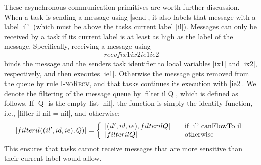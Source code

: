 These asynchronous communication primitives are worth further
discussion.  When a task is sending a message using |send|, it also labels that
message with a label |il'| (which must be above the tasks current label |il|).
Messages can only be received by a task if its current label is
at least as high as the label of the message.
Specifically, receiving a message using
\[ |recvf ix1 ix2 ie1 ie2| \]
binds the message and the senders task identifier
to local variables |ix1| and |ix2|, respectively, and then executes |ie1|.
Otherwise the message gets removed from the queue by rule \textsc{I-noRecv},
and that tasks continues its execution with |ie2|.
We denote the filtering of the message queue by |filter il Q|,
which is defined as follows.
If |Q| is the empty list |nil|, the
function is simply the identity function, i.e.,
|filter il nil = nil|, and otherwise:
\[
|filter il ((il', id, ie) , Q )| = \left\{
\begin{array}{l l}
|(il', id, ie) , filter il Q| & \quad \text{if |il' canFlowTo il|}\\
|filter il Q| & \quad \text{otherwise}
\end{array} \right.
\]
This ensures that tasks cannot receive messages that are more sensitive
than their current label would allow.

